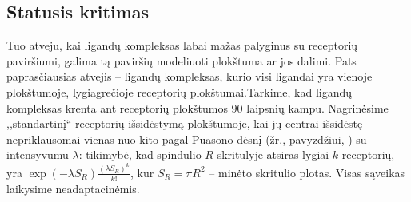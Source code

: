 \documentclass[10pt]{article}
\begin{document}
\subsection{Statusis kritimas}
Tuo atveju, kai ligandų kompleksas labai mažas palyginus su 
receptorių paviršiumi, galima tą paviršių modeliuoti plokštuma ar jos dalimi. 
Pats paprasčiausias atvejis -- ligandų kompleksas, kurio visi ligandai yra vienoje plokštumoje, lygiagrečioje  receptorių plokštumai.Tarkime, kad ligandų kompleksas  krenta ant receptorių plokštumos 90 laipsnių kampu. Nagrinėsime ,,standartinį``  receptorių išsidėstymą plokštumoje, kai  jų centrai išsidėstę nepriklausomai vienas nuo kito pagal Puasono dėsnį (žr., pavyzdžiui, \cite{Lange03}) su intensyvumu $\lambda$:  tikimybė, kad spindulio $R$ skritulyje atsiras lygiai $k$ receptorių, yra $ \exp(-\lambda S_R)\frac{(\lambda S_R)^k}{k!} $, kur $S_R = \pi R^2$ -- minėto skritulio plotas. Visas sąveikas laikysime neadaptacinėmis. 


\end{document}
